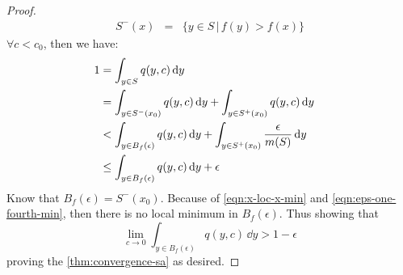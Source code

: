 \begin{theorem}
\begin{proof}
\begin{eqnarray}
    S^-(x) & = & \{ y \in S \, | \, f(y) > f(x) \} 
\end{eqnarray}
$\forall c < c_0$, then we have:
\begin{align}
    1 & = \int_{y \in S} q(y,c) \, \mathrm{d} y & \notag \\
    & = \int_{y \in S^-(x_0)} q(y,c) \, \mathrm{d} y + \int_{y \in S^+(x_0)} q(y,c) \, \mathrm{d} y & \notag \\
    & < \int_{y \in B_f(\epsilon)} q(y,c) \, \mathrm{d} y + \int_{y \in S^+(x_0)} \dfrac{\epsilon}{m(S)} \, \mathrm{d} y & \notag \\
    & \leq \int_{y \in B_f(\epsilon)} q(y,c) \, \mathrm{d} y + \epsilon 
\end{align}
Know that $B_f(\epsilon) = S^-(x_0)$. Because of \cref{eqn:x-loc-x-min} and \cref{eqn:eps-one-fourth-min}, then there is no local minimum in $B_f(\epsilon)$. Thus showing that
\begin{equation}
     \lim_{c \rightarrow 0} \int_{y \in B_f(\epsilon)} q(y,c) \, \dd y > 1-\epsilon
\end{equation}
proving the \cref{thm:convergence-sa} as desired.
\end{proof}
\end{theorem}
